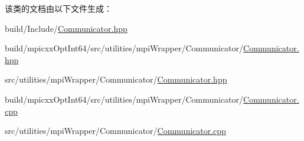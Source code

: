 该类的文档由以下文件生成：\begin{DoxyCompactItemize}
\item 
build/Include/\hyperlink{build_2Include_2Communicator_8hpp}{Communicator.hpp}\item 
build/mpicxxOptInt64/src/utilities/mpiWrapper/Communicator/\hyperlink{build_2mpicxxOptInt64_2src_2utilities_2mpiWrapper_2Communicator_2Communicator_8hpp}{Communicator.hpp}\item 
src/utilities/mpiWrapper/Communicator/\hyperlink{src_2utilities_2mpiWrapper_2Communicator_2Communicator_8hpp}{Communicator.hpp}\item 
build/mpicxxOptInt64/src/utilities/mpiWrapper/Communicator/\hyperlink{build_2mpicxxOptInt64_2src_2utilities_2mpiWrapper_2Communicator_2Communicator_8cpp}{Communicator.cpp}\item 
src/utilities/mpiWrapper/Communicator/\hyperlink{src_2utilities_2mpiWrapper_2Communicator_2Communicator_8cpp}{Communicator.cpp}\end{DoxyCompactItemize}
